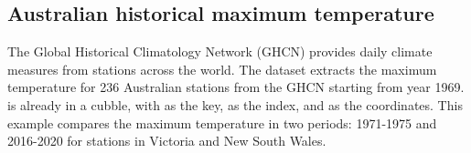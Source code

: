 \documentclass{article}
\newenvironment{Shaded}{\begin{snugshade}}{\end{snugshade}}
\newcommand{\AttributeTok}[1]{\textcolor[rgb]{0.77,0.63,0.00}{#1}}
\newcommand{\FunctionTok}[1]{\textcolor[rgb]{0.00,0.00,0.00}{#1}}
\newcommand{\NormalTok}[1]{#1}
\newcommand{\OtherTok}[1]{\textcolor[rgb]{0.56,0.35,0.01}{#1}}
\newcommand{\SpecialCharTok}[1]{\textcolor[rgb]{0.00,0.00,0.00}{#1}}
\newcommand{\StringTok}[1]{\textcolor[rgb]{0.31,0.60,0.02}{#1}}
\begin{document}
\begin{Shaded}
\end{Shaded}

\hypertarget{australian-historical-maximum-temperature}{%
\subsection{Australian historical maximum temperature}\label{australian-historical-maximum-temperature}}

The Global Historical Climatology Network (GHCN) provides daily climate measures from stations across the world. The dataset  extracts the maximum temperature for 236 Australian stations from the GHCN starting from year 1969.  is already in a cubble, with  as the key,  as the index, and  as the coordinates. This example compares the maximum temperature in two periods: 1971-1975 and 2016-2020 for stations in Victoria and New South Wales.
\end{document}
